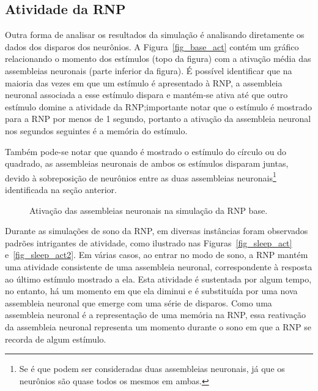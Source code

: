 \subsection{Atividade da RNP}

Outra forma de analisar os resultados da simulação é analisando diretamente os dados dos disparos dos neurônios. A
Figura~\ref{fig_base_act} contém um gráfico relacionando o momento dos estímulos (topo da figura) com a ativação média das
assembleias neuronais (parte inferior da figura). É possível identificar que na maioria das vezes em que um estímulo é apresentado
à RNP, a assembleia neuronal associada a esse estímulo dispara e mantém-se ativa até que outro estímulo domine a atividade da
RNP; importante notar que o estímulo é mostrado para a RNP por menos de 1 segundo, portanto a ativação da assembleia neuronal
nos segundos seguintes é a memória do estímulo.

Também pode-se notar que quando é mostrado o estímulo do círculo ou do quadrado, as assembleias neuronais de ambos os estímulos
disparam juntas, devido à sobreposição de neurônios entre as duas assembleias neuronais\footnote{Se é que podem ser consideradas
duas assembleias neuronais, já que os neurônios são quase todos os mesmos em ambas.} identificada na seção anterior.

\begin{figure}[!ht]
\caption{Ativação das assembleias neuronais na simulação da RNP base.}
\end{figure}

Durante as simulações de sono da RNP, em diversas instâncias foram observados padrões intrigantes de atividade, como ilustrado nas
Figuras~\ref{fig_sleep_act} e~\ref{fig_sleep_act2}. Em várias casos, ao entrar no modo de sono, a RNP mantém uma atividade
consistente de uma assembleia neuronal, correspondente à resposta ao último estímulo mostrado a ela. Esta atividade é sustentada
por algum tempo, no entanto, há um momento em que ela diminui e é substituída por uma nova assembleia neuronal que emerge com uma
série de disparos. Como uma assembleia neuronal é a representação de uma memória na RNP, essa reativação da assembleia neuronal
representa um momento durante o sono em que a RNP se recorda de algum estímulo.

